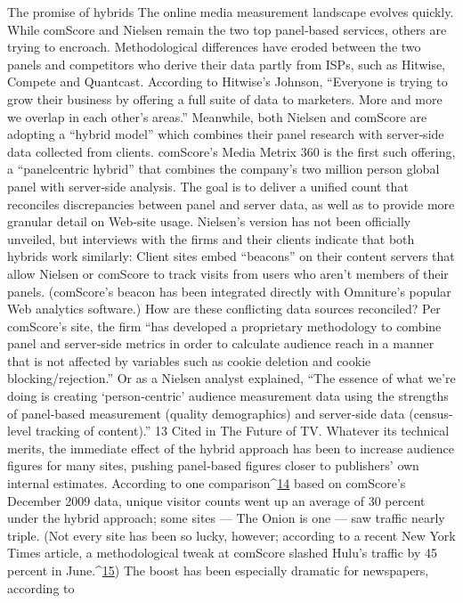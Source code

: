 The promise of hybrids
The online media measurement landscape evolves quickly. While
comScore and Nielsen remain the two top panel‐based services, others are
trying to encroach. Methodological differences have eroded between the
two panels and competitors who derive their data partly from ISPs, such
as Hitwise, Compete and Quantcast. According to Hitwise’s Johnson,
``Everyone is trying to grow their business by offering a full suite of data
to marketers. More and more we overlap in each other’s areas.''
Meanwhile, both Nielsen and comScore are adopting a ``hybrid model''
which combines their panel research with server‐side data collected from
clients. comScore’s Media Metrix 360 is the first such offering, a ``panelcentric
hybrid'' that combines the company’s two million person global
panel with server‐side analysis. The goal is to deliver a unified count that
reconciles discrepancies between panel and server data, as well as to
provide more granular detail on Web‐site usage.
Nielsen’s version has not been officially unveiled, but interviews with the
firms and their clients indicate that both hybrids work similarly: Client
sites embed ``beacons'' on their content servers that allow Nielsen or
comScore to track visits from users who aren’t members of their panels.
(comScore’s beacon has been integrated directly with Omniture’s popular
Web analytics software.)
How are these conflicting data sources reconciled? Per comScore’s site, the
firm ``has developed a proprietary methodology to combine panel and
server‐side metrics in order to calculate audience reach in a manner that is
not affected by variables such as cookie deletion and cookie
blocking/rejection.'' Or as a Nielsen analyst explained, ``The essence of
what we’re doing is creating ‘person‐centric’ audience measurement data
using the strengths of panel‐based measurement (quality demographics)
and server‐side data (census‐level tracking of content).''
13 Cited in The Future of TV.
Whatever its technical merits, the immediate effect of the hybrid approach
has been to increase audience figures for many sites, pushing panel‐based
figures closer to publishers’ own internal estimates. According to one
comparison^{\href{#endnotes}{14}} based on comScore’s December 2009 data, unique visitor
counts went up an average of 30 percent under the hybrid approach; some
sites — The Onion is one — saw traffic nearly triple. (Not every site has
been so lucky, however; according to a recent New York Times article, a
methodological tweak at comScore slashed Hulu’s traffic by 45 percent in
June.^{\href{#endnotes}{15}})
The boost has been especially dramatic for newspapers, according to
